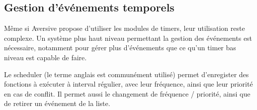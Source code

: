 \subsection{Gestion d'événements temporels}

Même si Aversive propose d'utiliser les modules de timers, leur utilisation reste complexe. Un système plus haut niveau permettant la gestion des événements est nécessaire, notamment pour gérer plus d'événements que ce qu'un timer bas niveau est capable de faire.

Le scheduler (le terme anglais est communément utilisé) permet d'enregister des fonctions à exécuter à interval régulier, avec leur fréquence, ainsi que leur priorité en cas de conflit. Il permet aussi le changement de fréquence / priorité, ainsi que de retirer un événement de la liste.
\clearpage
